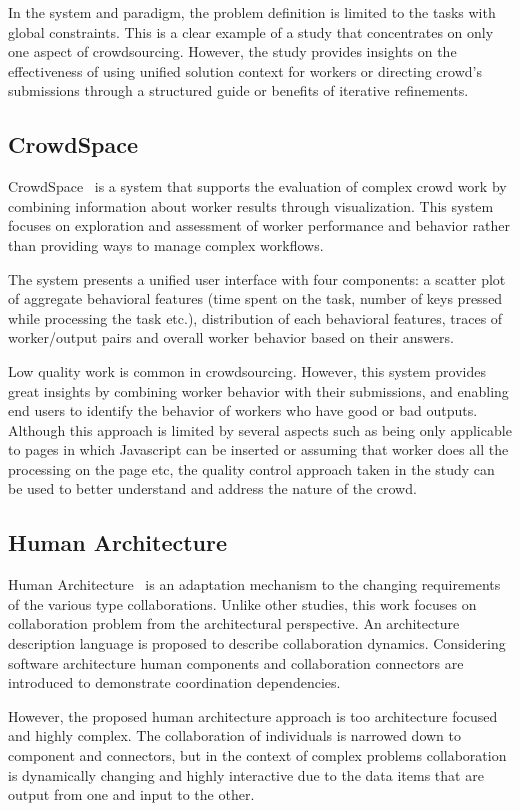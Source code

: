 In the system and paradigm, the problem definition is limited to the tasks 
with global constraints. This is a clear example of a study that concentrates 
on only one aspect of crowdsourcing. However, the study provides insights 
on the effectiveness of using unified solution context for workers or directing 
crowd's submissions through a structured guide or benefits of iterative refinements.

\subsection{CrowdSpace}
CrowdSpace~\cite{Rzeszotarski2012} is a system that supports the evaluation 
of complex crowd work by combining information about worker results through 
visualization. This system focuses on exploration and assessment of worker 
performance and behavior rather than providing ways to manage complex workflows.

The system presents a unified user interface with four components: a scatter plot 
of aggregate behavioral features (time spent on the task, number of keys pressed 
while processing the task etc.), distribution of each behavioral features, 
traces of worker/output pairs and overall worker behavior based on their answers.

Low quality work is common in crowdsourcing. However, this system provides 
great insights by combining worker behavior with their submissions, and enabling 
end users to identify the behavior of workers who have good or bad outputs. 
Although this approach is limited by several aspects such as being only applicable to 
pages in which Javascript can be inserted or assuming that worker does all the processing 
on the page etc, the quality control approach taken in the study can be used to 
better understand and address the nature of the crowd.

\subsection{Human Architecture}
Human Architecture~\cite{Dorn2012} is an adaptation mechanism to the changing 
requirements of the various type collaborations. Unlike other studies, this work focuses 
on collaboration problem from the architectural perspective. An architecture description 
language is proposed to describe collaboration dynamics. Considering software architecture 
human components and collaboration connectors are introduced to demonstrate 
coordination dependencies. 

However, the proposed human architecture approach is too architecture focused and 
highly complex. The collaboration of individuals is narrowed down to component 
and connectors, but in the context of complex problems collaboration is dynamically 
changing and highly interactive due to the data items that are output from one 
and input to the other. 
